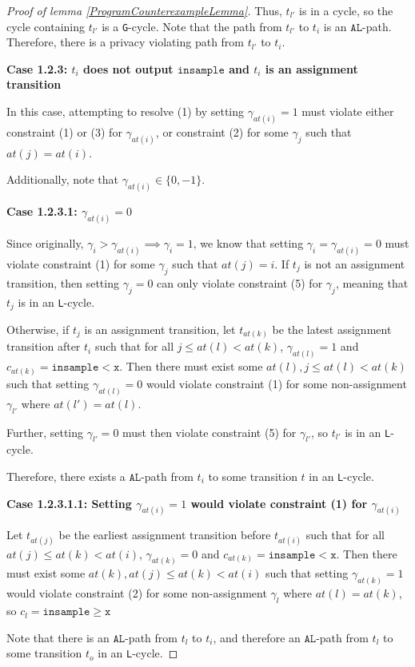 \documentclass[12pt]{article}
\newcommand{\gguard}[1][x]{\texttt{insample}\geq #1}
\newcommand{\lguard}[1][x]{\texttt{insample} < #1}
\newcommand{\gcycle}{\texttt{G}-cycle}
\newcommand{\lcycle}{\texttt{L}-cycle}
\theoremstyle{definition}
\begin{document}
\begin{proof}[Proof of lemma \ref{ProgramCounterexampleLemma}]
    Thus, $t_{l'}$ is in a cycle, so the cycle containing $t_{l'}$ is a \gcycle. Note that the path from $t_{l'}$ to $t_i$ is an $\texttt{AL}$-path. Therefore, there is a privacy violating path from $t_{l'}$ to $t_i$.

    \textbf{Case 1.2.3: $t_i$ does not output $\texttt{insample}$ and $t_i$ is an assignment transition}

    In this case, attempting to resolve (1) by setting $\gamma_{at(i)} = 1$ must violate either constraint (1) or (3) for $\gamma_{at(i)}$, or constraint (2) for some $\gamma_j$ such that $at(j) = at(i)$. 

    Additionally, note that $\gamma_{at(i)} \in \{0, -1\}$. 

    \textbf{Case 1.2.3.1: $\gamma_{at(i)} =0$}

    Since originally, $\gamma_i > \gamma_{at(i)} \implies \gamma_i = 1$, we know that setting $\gamma_i = \gamma_{at(i)} = 0$ must violate constraint (1) for some $\gamma_j$ such that $at(j) = i$. If $t_{j}$ is not an assignment transition, then setting $\gamma_{j} = 0$ can only violate constraint (5) for $\gamma_{j}$, meaning that $t_j$ is in an \lcycle.

    Otherwise, if $t_j$ is an assignment transition, let $t_{at(k)}$ be the latest assignment transition after $t_{i}$ such that for all $j\leq at(l)< at(k)$, $\gamma_{at(l)} =1$ and $c_{at(k)} = \lguard[\texttt{x}]$. Then there must exist some $at(l), j\leq at(l)< at(k)$ such that setting $\gamma_{at(l)}=0$ would violate constraint (1) for some non-assignment $\gamma_{l'}$ where $at(l') = at(l)$. 

    Further, setting $\gamma_{l'} = 0$ must then violate constraint (5) for $\gamma_{l'}$, so $t_{l'}$ is in an \lcycle. 

    Therefore, there exists a $\texttt{AL}$-path from $t_i$ to some transition $t$ in an \lcycle. 

    \textbf{Case 1.2.3.1.1: Setting $\gamma_{at(i)} = 1$ would violate constraint (1) for $\gamma_{at(i)}$}

    Let $t_{at(j)}$ be the earliest assignment transition before $t_{at(i)}$ such that for all $at(j)\leq at(k)< at(i)$, $\gamma_{at(k)} =0$ and $c_{at(k)} = \lguard[\texttt{x}]$. Then there must exist some $at(k), at(j)\leq at(k)< at(i)$ such that setting $\gamma_{at(k)}=1$ would violate constraint (2) for some non-assignment $\gamma_l$ where $at(l) = at(k)$, so $c_l = \gguard[\texttt{x}]$

    Note that there is an $\texttt{AL}$-path from $t_l$ to $t_i$, and therefore an $\texttt{AL}$-path from $t_l$ to some transition $t_{o}$ in an \lcycle. 


\end{proof}
\end{document}
